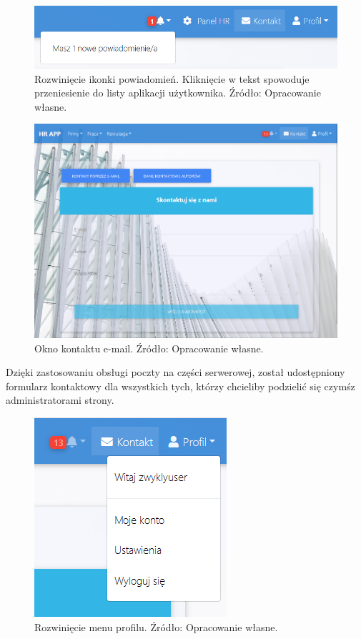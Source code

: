 \documentclass[twoside]{projektInzynierskiMS}
\numberwithin{figure}{section}
\begin{document}
\newpage

\begin{figure}[h!]
    \centering
    \includegraphics[width = \textwidth]{images/powiadomienie.png}
    \caption{Rozwinięcie ikonki powiadomień. Kliknięcie w tekst spowoduje przeniesienie do listy aplikacji użytkownika. Źródło: Opracowanie własne.}
    \label{fig:ikonka_powiadomień_użytkownika_rozwinięta}
\end{figure}

\begin{figure}[h!]
    \centering
    \includegraphics[width = \textwidth]{images/oknoKontaktuEmail.png}
    \caption{Okno kontaktu e-mail. Źródło: Opracowanie własne.}
    \label{fig:okno_kontaktu_email}
\end{figure}

Dzięki zastosowaniu obsługi poczty na części serwerowej, został udostępniony formularz kontaktowy dla wszystkich tych, którzy chcieliby podzielić się czymś\linebreak z administratorami strony.

\newpage

\begin{figure}[h!]
    \centering
    \includegraphics[scale=0.7]{images/rozwinięcieProfilu.png}
    \caption{Rozwinięcie menu profilu. Źródło: Opracowanie własne.}
    \label{fig:rozwinięcie_profilu}
\end{figure}
\end{document}
